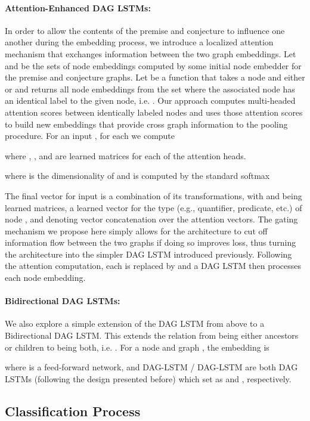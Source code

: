 \documentclass{article}
\begin{document}
\paragraph{Attention-Enhanced DAG LSTMs:} In order to allow the contents of the premise and conjecture to influence one another during the embedding process, we introduce a localized attention mechanism that exchanges information between the two graph embeddings. Let  and  be the sets of node embeddings computed by some initial node embedder for the premise and conjecture graphs. Let  be a function that takes a node and either  or  and returns all node embeddings from the set where the associated node has an identical label to the given node, i.e. . Our approach computes multi-headed attention scores \cite{vaswani2017attention} between identically labeled nodes and uses those attention scores to build new embeddings that provide cross graph information to the pooling procedure. For an input , for each  we compute

where , , and  are learned matrices for each of the  attention heads.

where  is the dimensionality of  and  is computed by the standard softmax

The final vector  for input  is a combination of its  transformations, with  and  being learned matrices,  a learned vector for the type (e.g., quantifier, predicate, etc.) of node , and  denoting vector concatenation over the  attention vectors. The gating mechanism  we propose here simply allows for the architecture to cut off information flow between the two graphs if doing so improves loss, thus turning the architecture into the simpler DAG LSTM introduced previously.
Following the attention computation, each  is replaced by  and a DAG LSTM then processes each node embedding.



\paragraph{Bidirectional DAG LSTMs:} We also explore a simple extension of the DAG LSTM from above to a Bidirectional DAG LSTM. This extends the  relation from being either ancestors or children to being both, i.e. . For a node  and graph , the embedding  is

where  is a feed-forward network, and DAG-LSTM / DAG-LSTM are both DAG LSTMs (following the design presented before) which set  as  and , respectively.

\subsection{Classification Process}
\end{document}
